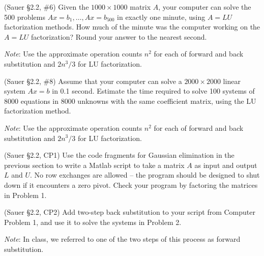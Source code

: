 \documentclass[12pt,fleqn]{exam}
\begin{document}
\begin{questions}

\question (Sauer \S2.2, \#6) Given the $1000 \times 1000$ matrix $A$, your computer can solve the 500 problems $Ax = b_1, \dots, Ax = b_{500}$ in exactly one minute, using $A = LU$ factorization methods. How much of the minute was the computer working on the $A = LU$ factorization? Round your answer to the nearest second.

\emph{Note}: Use the approximate operation counts $n^2$ for each of forward and back substitution and $2n^3/3$ for LU factorization.

\question (Sauer \S2.2, \#8) Assume that your computer can solve a $2000 \times 2000$ linear system $Ax = b$ in 0.1 second. Estimate the time required to solve 100 systems of 8000 equations in 8000 unknowns with the same coefficient matrix, using the LU factorization method.

\emph{Note}: Use the approximate operation counts $n^2$ for each of forward and back substitution and $2n^3/3$ for LU factorization.

\question (Sauer \S2.2, CP1) Use the code fragments for Gaussian elimination in the previous section to write a Matlab script to take a matrix $A$ as input and output $L$ and $U$. No row exchanges are allowed -- the program should be designed to shut down if it encounters a zero pivot. Check your program by factoring the matrices in Problem 1. 

\question (Sauer \S2.2, CP2) Add two-step back substitution to your script from Computer Problem 1, and use it to solve the systems in Problem 2.

\emph{Note}: In class, we referred to one of the two steps of this process as forward substitution.


\end{questions}
\end{document}
